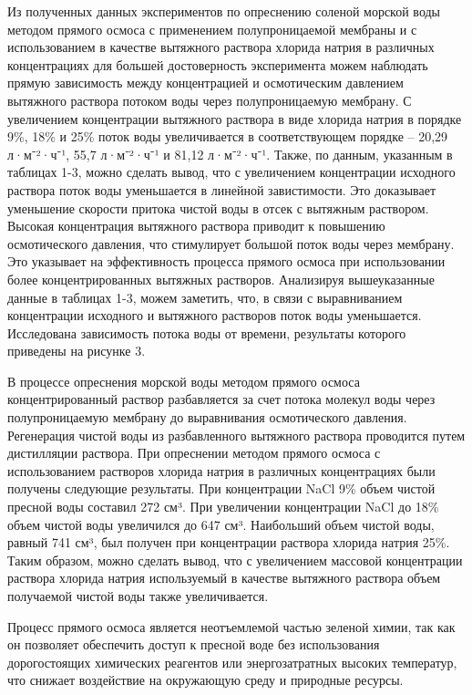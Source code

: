\begin{multicols}{2}
Из полученных данных экспериментов по опреснению соленой морской воды
методом прямого осмоса с применением полупроницаемой мембраны и с
использованием в качестве вытяжного раствора хлорида натрия в различных
концентрациях для большей достоверность эксперимента можем наблюдать
прямую зависимость между концентрацией и осмотическим давлением
вытяжного раствора потоком воды через полупроницаемую мембрану. С
увеличением концентрации вытяжного раствора в виде хлорида натрия в
порядке 9\%, 18\% и 25\% поток воды увеличивается в соответствующем
порядке -- 20,29 л·м⁻²·ч⁻¹, 55,7 л·м⁻²·ч⁻¹ и 81,12 л·м⁻²·ч⁻¹. Также, по
данным, указанным в таблицах 1-3, можно сделать вывод, что с увеличением
концентрации исходного раствора поток воды уменьшается в линейной
завистимости. Это доказывает уменьшение скорости притока чистой воды в
отсек с вытяжным раствором. Высокая концентрация вытяжного раствора
приводит к повышению осмотического давления, что стимулирует большой
поток воды через мембрану. Это указывает на эффективность процесса
прямого осмоса при использовании более концентрированных вытяжных
растворов. Анализируя вышеуказанные данные в таблицах 1-3, можем
заметить, что, в связи с выравниванием концентрации исходного и
вытяжного растворов поток воды уменьшается. Исследована зависимость
потока воды от времени, результаты которого приведены на рисунке 3.

В процессе опреснения морской воды методом прямого осмоса
концентрированный раствор разбавляется за счет потока молекул воды через
полупроницаемую мембрану до выравнивания осмотического давления.
Регенерация чистой воды из разбавленного вытяжного раствора проводится
путем дистилляции раствора. При опреснении методом прямого осмоса с
использованием растворов хлорида натрия в различных концентрациях были
получены следующие результаты. При концентрации NaCl 9\% объем чистой
пресной воды составил 272 см³. При увеличении концентрации NaCl до 18\%
объем чистой воды увеличился до 647 см³. Наибольший объем чистой воды,
равный 741 см³, был получен при концентрации раствора хлорида натрия
25\%. Таким образом, можно сделать вывод, что с увеличением массовой
концентрации раствора хлорида натрия используемый в качестве вытяжного
раствора объем получаемой чистой воды также увеличивается.

Процесс прямого осмоса является неотъемлемой частью зеленой химии, так
как он позволяет обеспечить доступ к пресной воде без использования
дорогостоящих химических реагентов или энергозатратных высоких
температур, что снижает воздействие на окружающую среду и природные
ресурсы.


\end{multicols}
